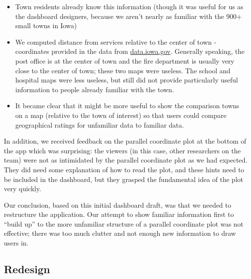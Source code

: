 \documentclass[letterpaper,inpress]{jdsart}
\providecommand{\tightlist}{%
  \setlength{\itemsep}{0pt}\setlength{\parskip}{0pt}}
\begin{document}
\begin{itemize}
\tightlist
\item
  Town residents already know this information (though it was useful for us as the dashboard designers, because we aren't nearly as familiar with the 900+ small towns in Iowa)
\item
  We computed distance from services relative to the center of town - coordinates provided in the data from \url{data.iowa.gov}. Generally speaking, the post office is at the center of town and the fire department is usually very close to the center of town; these two maps were useless. The school and hospital maps were less useless, but still did not provide particularly useful information to people already familiar with the town.
\item
  It became clear that it might be more useful to show the comparison towns on a map (relative to the town of interest) so that users could compare geographical ratings for unfamiliar data to familiar data.
\end{itemize}

In addition, we received feedback on the parallel coordinate plot at the bottom of the app which was surprising: the viewers (in this case, other researchers on the team) were not as intimidated by the parallel coordinate plot as we had expected. They did need some explanation of how to read the plot, and these hints need to be included in the dashboard, but they grasped the fundamental idea of the plot very quickly.

Our conclusion, based on this initial dashboard draft, was that we needed to restructure the application. Our attempt to show familiar information first to ``build up'' to the more unfamiliar structure of a parallel coordinate plot was not effective; there was too much clutter and not enough new information to draw users in.

\subsection{ Redesign }
\end{document}
